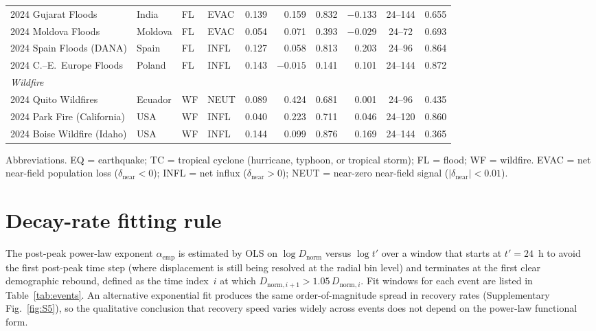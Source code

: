 \documentclass[11pt]{article}
\newcommand{\dnear}{\delta_{\mathrm{near}}}
\newcommand{\aemp}{\alpha_{\mathrm{emp}}}
\newcommand{\Dnorm}{D_{\mathrm{norm}}}
\begin{document}
\begin{table}[h]
\begin{tabular}{@{}llllrrrrcr@{}}
2024 Gujarat Floods               & India      & FL & EVAC & 0.139 & 0.159 & 0.832 & $-0.133$ & 24--144 & 0.655 \\
2024 Moldova Floods               & Moldova    & FL & EVAC & 0.054 & 0.071 & 0.393 & $-0.029$ & 24--72  & 0.693 \\
2024 Spain Floods (DANA)          & Spain      & FL & INFL & 0.127 & 0.058 & 0.813 &  0.203 & 24--96  & 0.864 \\
2024 C.--E.~Europe Floods         & Poland     & FL & INFL & 0.143 & $-0.015$ & 0.141 &  0.101 & 24--144 & 0.872 \\
\midrule
\multicolumn{10}{l}{\textit{Wildfire}} \\[2pt]
2024 Quito Wildfires              & Ecuador    & WF & NEUT & 0.089 & 0.424 & 0.681 &  0.001 & 24--96  & 0.435 \\
2024 Park Fire (California)       & USA        & WF & INFL & 0.040 & 0.223 & 0.711 &  0.046 & 24--120 & 0.860 \\
2024 Boise Wildfire (Idaho)       & USA        & WF & INFL & 0.144 & 0.099 & 0.876 &  0.169 & 24--144 & 0.365 \\
\bottomrule
\end{tabular}
\end{table}

\noindent
Abbreviations.  EQ = earthquake; TC = tropical cyclone
(hurricane, typhoon, or tropical storm); FL = flood; WF = wildfire.
EVAC = net near-field population loss ($\dnear < 0$);
INFL = net influx ($\dnear > 0$);
NEUT = near-zero near-field signal ($|\dnear| < 0.01$).


\section{Decay-rate fitting rule}
\label{sec:si_robustness}

The post-peak power-law exponent $\aemp$ is estimated by OLS on
$\log \Dnorm$ versus $\log t'$ over a window that starts at
$t' = 24$~h to avoid the first post-peak time step (where displacement
is still being resolved at the radial bin level) and terminates at the
first clear demographic rebound, defined as the time index~$i$ at which
$D_{\mathrm{norm},i+1} > 1.05\,D_{\mathrm{norm},i}$.  Fit windows for
each event are listed in Table~\ref{tab:events}.  An alternative
exponential fit produces the same order-of-magnitude spread in recovery
rates (Supplementary Fig.~\ref{fig:S5}), so the qualitative conclusion
that recovery speed varies widely across events does not depend on the
power-law functional form.
\end{document}
